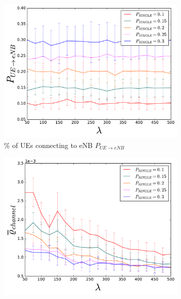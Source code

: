 \begin{figure}[H]
  \begin{subfigure}[b]{0.5\linewidth}
    \centering
    \captionsetup{justification=centering}
    \includegraphics[width=1\linewidth]{figures/SINGLELINES_2} 
    \caption{\% of UEs connecting to eNB $P_{UE\rightarrow eNB}$ }
    \label{fig:SINGLELINES_2} 
    \vspace{4ex}
  \end{subfigure}%
  \begin{subfigure}[b]{0.5\linewidth}
    \centering
    \captionsetup{justification=centering}
    \includegraphics[width=1\linewidth]{figures/SINGLELINES_8} 

\end{subfigure}
\end{figure}
